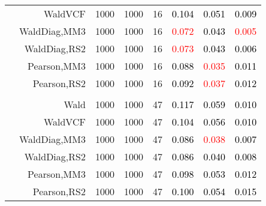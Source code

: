 \documentclass[
]{article}
\begin{document}
\begin{table}[H]
{\begin{tabular}[t]{lrrrrrrr}
\hspace{1em} & WaldVCF & 1000 & 1000 & 16 & \textcolor{black}{0.104} & \textcolor{black}{0.051} & \textcolor{black}{0.009}\\

\hspace{1em} & WaldDiag,MM3 & 1000 & 1000 & 16 & \textcolor{red}{0.072} & \textcolor{black}{0.043} & \textcolor{red}{0.005}\\

\hspace{1em} & WaldDiag,RS2 & 1000 & 1000 & 16 & \textcolor{red}{0.073} & \textcolor{black}{0.043} & \textcolor{black}{0.006}\\

\hspace{1em} & Pearson,MM3 & 1000 & 1000 & 16 & \textcolor{black}{0.088} & \textcolor{red}{0.035} & \textcolor{black}{0.011}\\

\hspace{1em} & Pearson,RS2 & 1000 & 1000 & 16 & \textcolor{black}{0.092} & \textcolor{red}{0.037} & \textcolor{black}{0.012}\\
\cmidrule{1-8}
\addlinespace[0.3em]
\multicolumn{8}{l}{\textbf{3F 15V}}\\
\hspace{1em} & Wald & 1000 & 1000 & 47 & \textcolor{black}{0.117} & \textcolor{black}{0.059} & \textcolor{black}{0.010}\\

\hspace{1em} & WaldVCF & 1000 & 1000 & 47 & \textcolor{black}{0.104} & \textcolor{black}{0.056} & \textcolor{black}{0.010}\\

\hspace{1em} & WaldDiag,MM3 & 1000 & 1000 & 47 & \textcolor{black}{0.086} & \textcolor{red}{0.038} & \textcolor{black}{0.007}\\

\hspace{1em} & WaldDiag,RS2 & 1000 & 1000 & 47 & \textcolor{black}{0.086} & \textcolor{black}{0.040} & \textcolor{black}{0.008}\\

\hspace{1em} & Pearson,MM3 & 1000 & 1000 & 47 & \textcolor{black}{0.098} & \textcolor{black}{0.053} & \textcolor{black}{0.012}\\

\hspace{1em} & Pearson,RS2 & 1000 & 1000 & 47 & \textcolor{black}{0.100} & \textcolor{black}{0.054} & \textcolor{black}{0.015}\\
\bottomrule
\end{tabular}}
\endgroup{}
\end{table}
\end{document}
